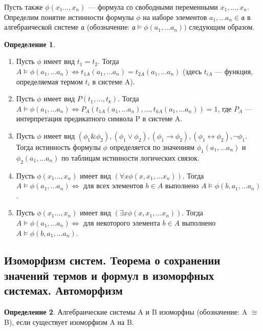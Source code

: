 \documentclass[a4paper]{article}
\theoremstyle{definition}
\newtheorem*{definition}{Определение}
\theoremstyle{remark}
\begin{document}
    Пусть также $\phi(x_1 \dots, x_n)$ — формула со свободными переменными $x_1, \dots, x_n$. Определим 
    понятие истинности формулы $\phi$ на наборе элементов $a_1, \dots a_n \in \mathfrak{a}$ в алгебраической 
    системе $\mathfrak{a}$ (обозначение: $\mathfrak{a} \models \phi(a_1, \dots a_n))$ следующим образом.
    \begin{definition}
        \begin{enumerate}
            \item Пусть $\phi$ имеет вид $t_1 = t_2$. Тогда $A \models \phi(a_1, \dots a_n) \Leftrightarrow t_{1A}(a_1, \dots a_n) = t_{2A}(a_1, \dots a_n)$ (здесь $t_{iA}$ —
            функция, определяемая термом $t_i$ в системе A).
            \item Пусть $\phi$ имеет вид $P(t_1,\dots, t_k)$. Тогда 
            $A \models \phi(a_1, \dots a_n) \Leftrightarrow P_A(t_{1A}(a_1, \dots a_n), \dots, t_{kA}(a_1, \dots a_n)) = 1$, 
            где $P_A$ — интерпретация предикатного символа P в системе A.
            \item Пусть $\phi$ имеет вид $(\phi_1 \& \phi_2), (\phi_1 \vee \phi_2), (\phi_1 \rightarrow \phi_2), (\phi_1 \leftrightarrow \phi_2), \neg\phi_1$. Тогда истинность формулы 
            $\phi$ определяется по значениям $\phi_1(a_1, \dots a_n)$ и $\phi_2(a_1, \dots a_n)$ по таблицам истинности логических 
            связок.
            \item Пусть $\phi(x_1 \dots, x_n)$ имеет вид $(\forall x \phi(x, x_1, \dots x_n))$. Тогда $A \models \phi(a_1, \dots a_n) \Leftrightarrow$ для всех элементов 
            $b \in A$ выполнено $A \models \phi (b, a_1, \dots a_n)$.
            \item Пусть $\phi(x_1 \dots, x_n)$ имеет вид $(\exists x \phi(x, x_1, \dots x_n))$. Тогда $A \models \phi(a_1, \dots a_n) \Leftrightarrow$ для некоторого 
            элемента $b \in A$ выполнено $A \models \phi (b, a_1, \dots a_n)$.
        \end{enumerate}
    \end{definition}
    \subsection{Изоморфизм систем. Теорема о сохранении значений термов и формул в изоморфных системах. Автоморфизм}
    \begin{definition}
        Алгебраические системы A и B изоморфны (обозначение: A $\cong$ B), если существует 
        изоморфизм A на B.
    \end{definition}
\end{document}
